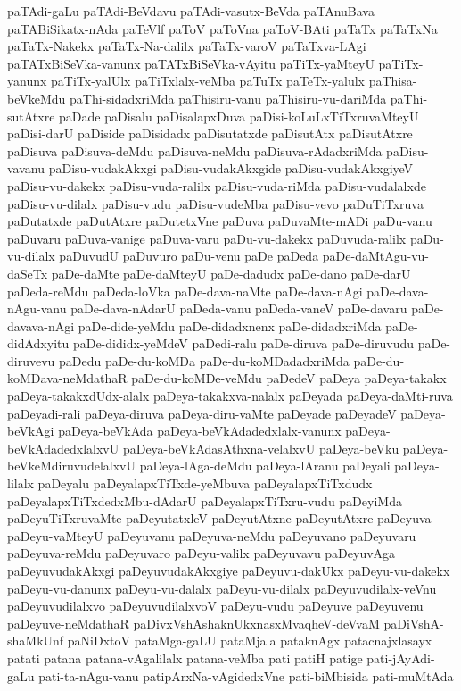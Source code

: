 {paTAdi-gaLu
paTAdi-BeVdavu
paTAdi-vasutx-BeVda
paTAnuBava
paTABiSikatx-nAda
paTeVlf
paToV
paToVna
paToV-BAti
paTaTx
paTaTxNa
paTaTx-Nakekx
paTaTx-Na-dalilx
paTaTx-varoV
paTaTxva-LAgi
paTATxBiSeVka-vanunx
paTATxBiSeVka-vAyitu
paTiTx-yaMteyU
paTiTx-yanunx
paTiTx-yalUlx
paTiTxlalx-veMba
paTuTx
paTeTx-yalulx
paThisa-beVkeMdu
paThi-sidadxriMda
paThisiru-vanu
paThisiru-vu-dariMda
paThi-sutAtxre
paDade
paDisalu
paDisalapxDuva
paDisi-koLuLxTiTxruvaMteyU
paDisi-darU
paDiside
paDisidadx
paDisutatxde
paDisutAtx
paDisutAtxre
paDisuva
paDisuva-deMdu
paDisuva-neMdu
paDisuva-rAdadxriMda
paDisu-vavanu
paDisu-vudakAkxgi
paDisu-vudakAkxgide
paDisu-vudakAkxgiyeV
paDisu-vu-dakekx
paDisu-vuda-ralilx
paDisu-vuda-riMda
paDisu-vudalalxde
paDisu-vu-dilalx
paDisu-vudu
paDisu-vudeMba
paDisu-vevo
paDuTiTxruva
paDutatxde
paDutAtxre
paDutetxVne
paDuva
paDuvaMte-mADi
paDu-vanu
paDuvaru
paDuva-vanige
paDuva-varu
paDu-vu-dakekx
paDuvuda-ralilx
paDu-vu-dilalx
paDuvudU
paDuvuro
paDu-venu
paDe
paDeda
paDe-daMtAgu-vu-daSeTx
paDe-daMte
paDe-daMteyU
paDe-dadudx
paDe-dano
paDe-darU
paDeda-reMdu
paDeda-loVka
paDe-dava-naMte
paDe-dava-nAgi
paDe-dava-nAgu-vanu
paDe-dava-nAdarU
paDeda-vanu
paDeda-vaneV
paDe-davaru
paDe-davava-nAgi
paDe-dide-yeMdu
paDe-didadxnenx
paDe-didadxriMda
paDe-didAdxyitu
paDe-dididx-yeMdeV
paDedi-ralu
paDe-diruva
paDe-diruvudu
paDe-diruvevu
paDedu
paDe-du-koMDa
paDe-du-koMDadadxriMda
paDe-du-koMDava-neMdathaR
paDe-du-koMDe-veMdu
paDedeV
paDeya
paDeya-takakx
paDeya-takakxdUdx-alalx
paDeya-takakxva-nalalx
paDeyada
paDeya-daMti-ruva
paDeyadi-rali
paDeya-diruva
paDeya-diru-vaMte
paDeyade
paDeyadeV
paDeya-beVkAgi
paDeya-beVkAda
paDeya-beVkAdadedxlalx-vanunx
paDeya-beVkAdadedxlalxvU
paDeya-beVkAdasAthxna-velalxvU
paDeya-beVku
paDeya-beVkeMdiruvudelalxvU
paDeya-lAga-deMdu
paDeya-lAranu
paDeyali
paDeya-lilalx
paDeyalu
paDeyalapxTiTxde-yeMbuva
paDeyalapxTiTxdudx
paDeyalapxTiTxdedxMbu-dAdarU
paDeyalapxTiTxru-vudu
paDeyiMda
paDeyuTiTxruvaMte
paDeyutatxleV
paDeyutAtxne
paDeyutAtxre
paDeyuva
paDeyu-vaMteyU
paDeyuvanu
paDeyuva-neMdu
paDeyuvano
paDeyuvaru
paDeyuva-reMdu
paDeyuvaro
paDeyu-valilx
paDeyuvavu
paDeyuvAga
paDeyuvudakAkxgi
paDeyuvudakAkxgiye
paDeyuvu-dakUkx
paDeyu-vu-dakekx
paDeyu-vu-danunx
paDeyu-vu-dalalx
paDeyu-vu-dilalx
paDeyuvudilalx-veVnu
paDeyuvudilalxvo
paDeyuvudilalxvoV
paDeyu-vudu
paDeyuve
paDeyuvenu
paDeyuve-neMdathaR
paDivxVshAshaknUkxnasxMvaqheV-deVvaM
paDiVshA-shaMkUnf
paNiDxtoV
pataMga-gaLU
pataMjala
pataknAgx
patacnajxlasayx
patati
patana
patana-vAgalilalx
patana-veMba
pati
patiH
patige
pati-jAyAdi-gaLu
pati-ta-nAgu-vanu
patipArxNa-vAgidedxVne
pati-biMbisida
pati-muMtAda
}
